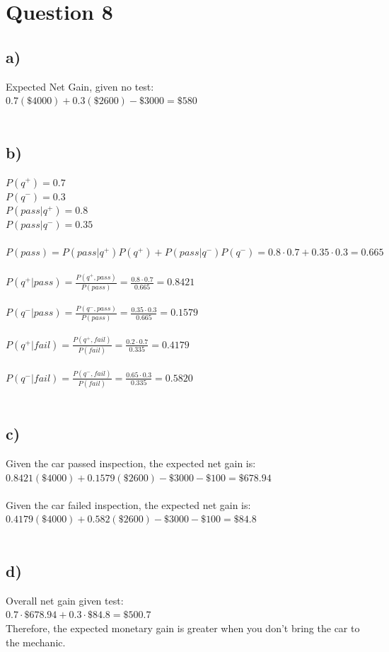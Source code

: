 \documentclass[11pt]{article} %
\begin{document}
\section*{Question 8}
\subsection*{a)}
Expected Net Gain, given no test:\\
$0.7(\$4000) + 0.3(\$2600) - \$3000 = \$580$\\\\

\subsection*{b)}
$P(q^{+}) = 0.7$\\
$P(q^{-}) = 0.3$\\
$P(pass|q^{+}) = 0.8$\\
$P(pass|q^{-}) = 0.35$\\\\
$P(pass) = P(pass|q^{+})P(q^{+}) + P(pass|q^{-})P(q^{-}) = 0.8 \cdot 0.7 + 0.35 \cdot 0.3 = 0.665$\\\\
$P(q^{+}|pass) = \frac{P(q^{+}, pass)}{P(pass)} = \frac{0.8 \cdot 0.7}{0.665} = 0.8421 $\\\\
$P(q^{-}|pass) = \frac{P(q^{-}, pass)}{P(pass)} = \frac{0.35 \cdot 0.3}{0.665} = 0.1579 $\\\\
$P(q^{+}|fail) = \frac{P(q^{+}, fail)}{P(fail)} = \frac{0.2 \cdot 0.7}{0.335} = 0.4179 $\\\\
$P(q^{-}|fail) = \frac{P(q^{-}, fail)}{P(fail)} = \frac{0.65 \cdot 0.3}{0.335} = 0.5820 $\\\\
\subsection*{c)}

Given the car passed inspection, the expected net gain is:\\
$0.8421(\$4000) + 0.1579(\$2600) - \$3000 -\$100 = \$678.94  $\\\\
Given the car failed inspection, the expected net gain is:\\
$0.4179(\$4000) + 0.582(\$2600) - \$3000 -\$100 = \$84.8$\\\\
\subsection*{d)}
Overall net gain given test:\\
$0.7 \cdot \$678.94 + 0.3 \cdot \$84.8 = \$500.7$\\
Therefore, the expected monetary gain is greater when you don't bring the car to the mechanic.
\end{document}
